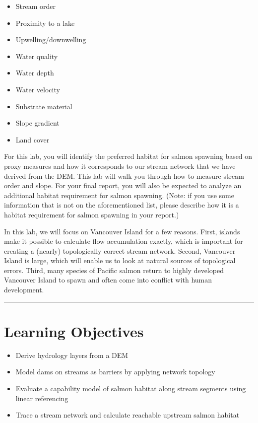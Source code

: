 \documentclass[
]{book}
\begin{document}
\begin{itemize}
\item
  Stream order
\item
  Proximity to a lake
\item
  Upwelling/downwelling
\item
  Water quality
\item
  Water depth
\item
  Water velocity
\item
  Substrate material
\item
  Slope gradient
\item
  Land cover
\end{itemize}

For this lab, you will identify the preferred habitat for salmon spawning based on proxy measures and how it corresponds to our stream network that we have derived from the DEM. This lab will walk you through how to measure stream order and slope. For your final report, you will also be expected to analyze an additional habitat requirement for salmon spawning. (Note: if you use some information that is not on the aforementioned list, please describe how it is a habitat requirement for salmon spawning in your report.)

In this lab, we will focus on Vancouver Island for a few reasons. First, islands make it possible to calculate flow accumulation exactly, which is important for creating a (nearly) topologically correct stream network. Second, Vancouver Island is large, which will enable us to look at natural sources of topological errors. Third, many species of Pacific salmon return to highly developed Vancouver Island to spawn and often come into conflict with human development.

\begin{center}\rule{0.5\linewidth}{0.5pt}\end{center}

\hypertarget{learning-objectives-1}{%
\section*{Learning Objectives}\label{learning-objectives-1}}

\begin{itemize}
\item
  Derive hydrology layers from a DEM
\item
  Model dams on streams as barriers by applying network topology
\item
  Evaluate a capability model of salmon habitat along stream segments using linear referencing
\item
  Trace a stream network and calculate reachable upstream salmon habitat
\end{itemize}
\end{document}
